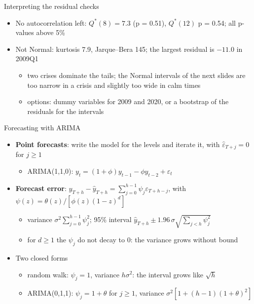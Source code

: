 \begin{frame}{Interpreting the residual checks}
\itemsize{\small}
\begin{itemize}
    \item No autocorrelation left: $Q^*(8) = 7.3$ (p = 0.51), $Q^*(12)$ p = 0.54; all p-values above 5\%
    \item Not Normal: kurtosis 7.9, Jarque--Bera 145; the largest residual is $\ensuremath{-}11.0$ in 2009Q1
    \begin{itemize}
        \item two crises dominate the tails; the Normal intervals of the next slides are too narrow in a crisis and slightly too wide in calm times
        \item options: dummy variables for 2009 and 2020, or a bootstrap of the residuals for the intervals
    \end{itemize}
\end{itemize}
\end{frame}

\begin{frame}{Forecasting with ARIMA}
\itemsize{\small}
\begin{itemize}
    \item \textbf{Point forecasts}: write the model for the levels and iterate it, with $\hat\varepsilon_{T+j} = 0$ for $j \ge 1$
    \begin{itemize}
        \item ARIMA(1,1,0): $y_t = (1 + \phi)y_{t-1} - \phi y_{t-2} + \varepsilon_t$
    \end{itemize}
    \item \textbf{Forecast error}: $y_{T+h} - \hat y_{T+h} = \sum_{j=0}^{h-1}\psi_j\varepsilon_{T+h-j}$, with $\psi(z) = \theta(z)/[\phi(z)(1 - z)^d]$
    \begin{itemize}
        \item variance $\sigma^2\sum_{j=0}^{h-1}\psi_j^2$; 95\% interval $\hat y_{T+h} \pm 1.96\,\sigma\sqrt{\sum_{j<h}\psi_j^2}$
        \item for $d \ge 1$ the $\psi_j$ do not decay to 0: the variance grows without bound
    \end{itemize}
    \item Two closed forms
    \begin{itemize}
        \item random walk: $\psi_j = 1$, variance $h\sigma^2$: the interval grows like $\sqrt{h}$
        \item ARIMA(0,1,1): $\psi_j = 1 + \theta$ for $j \ge 1$, variance $\sigma^2[1 + (h - 1)(1 + \theta)^2]$
    \end{itemize}
\end{itemize}
\end{frame}


